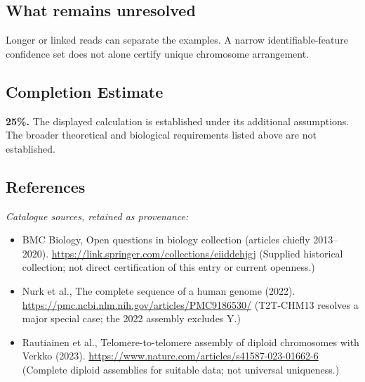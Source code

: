 \documentclass[11pt]{article}
\begin{document}
\subsection{What remains unresolved}
Longer or linked reads can separate the examples. A narrow identifiable-feature confidence set does not alone certify unique chromosome arrangement.
\subsection{Completion Estimate}
\textbf{25\%.} The displayed calculation is established under its additional assumptions. The broader theoretical and biological requirements listed above are not established.
\subsection{References}
\noindent\emph{Catalogue sources, retained as provenance:}
\begin{itemize}
\item BMC Biology, Open questions in biology collection (articles chiefly 2013--2020). \url{https://link.springer.com/collections/eiiddehjgj} (Supplied historical collection; not direct certification of this entry or current openness.)
\item Nurk et al., The complete sequence of a human genome (2022). \url{https://pmc.ncbi.nlm.nih.gov/articles/PMC9186530/} (T2T-CHM13 resolves a major special case; the 2022 assembly excludes Y.)
\item Rautiainen et al., Telomere-to-telomere assembly of diploid chromosomes with Verkko (2023). \url{https://www.nature.com/articles/s41587-023-01662-6} (Complete diploid assemblies for suitable data; not universal uniqueness.)
\end{itemize}
\end{document}
